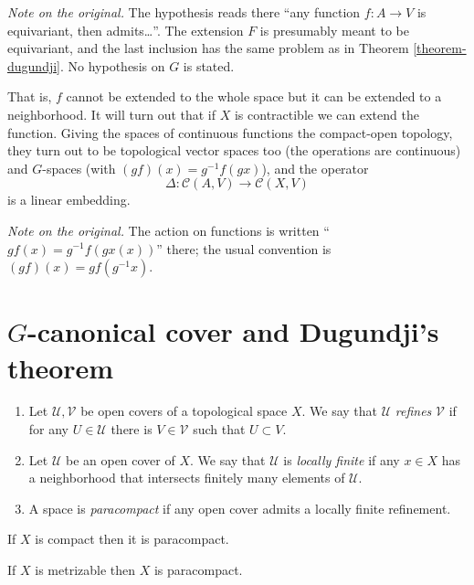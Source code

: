 \noindent
{\it Note on the original.} The
hypothesis reads there ``any function
$f:A\to V$ is equivariant, then
admits\ldots''. The extension $F$ is
presumably meant to be equivariant, and
the last inclusion has the same problem
as in Theorem \ref{theorem-dugundji}.
No hypothesis on $G$ is stated.

That is, $f$ cannot be extended to the
whole space but it can be extended to a
neighborhood. It will turn out that if
$X$ is contractible we can extend the
function. Giving the spaces of
continuous functions the compact-open
topology, they turn out to be
topological vector spaces too (the
operations are continuous) and
$G$-spaces (with
$(gf)(x)=g^{-1}f(gx)$), and the
operator
$$
\Delta:\mathcal{C}(A,V)
\to\mathcal{C}(X,V)
$$
is a linear embedding.

\noindent
{\it Note on the original.} The action
on functions is written
``$gf(x)=g^{-1}f(gx(x))$'' there; the
usual convention is
$(gf)(x)=gf(g^{-1}x)$.

\section{$G$-canonical cover and
Dugundji's theorem}
\label{section-canonical-cover}

\begin{definition}
\label{definition-refinement-paracompact}
\begin{enumerate}
\item Let $\mathcal{U},\mathcal{V}$ be
open covers of a topological space $X$.
We say that $\mathcal{U}$
{\it refines} $\mathcal{V}$ if for any
$U\in\mathcal{U}$ there is
$V\in\mathcal{V}$ such that
$U\subset V$.
\item Let $\mathcal{U}$ be an open
cover of $X$. We say that $\mathcal{U}$
is {\it locally finite} if any
$x\in X$ has a neighborhood that
intersects finitely many elements of
$\mathcal{U}$.
\item A space is {\it paracompact} if
any open cover admits a locally finite
refinement.
\end{enumerate}
\end{definition}

\begin{remark}
\label{remark-compact-paracompact}
If $X$ is compact then it is
paracompact.
\end{remark}

\begin{theorem}[Stone]
\label{theorem-stone}
If $X$ is metrizable then $X$ is
paracompact.
\end{theorem}

